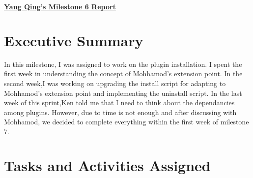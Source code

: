 
\pagestyle{headings}

\begin{center}
{\large\textbf{\underline{{Yang Qing's Milestone 6 Report}}}}
\end{center}

\section*{Executive Summary}
In this milestone, I was assigned to work on the plugin installation. I spent the first week in understanding the concept of Mohhamod's extension point. In the second week,I was working on upgrading the install script for adapting to Mohhamod's extension point and implementing the uninstall script. In the last week of this sprint,Ken told me that I need to think about the dependancies among plugins. However, due to time is not enough and after discussing with Mohhamod, we decided to complete everything within the first week of milestone 7.


\section*{Tasks and Activities Assigned}

